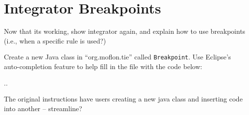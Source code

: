 \newpage
\section{Integrator Breakpoints}
\genHeader


Now that its working, show integrator again, and explain how to use breakpoints (i.e., when a specific rule is used?)

Create a new Java class in ``org.moflon.tie'' called \texttt{Breakpoint}. Use Eclipse's auto-completion feature to help fill in the file with the code below:

..

The original instructions have users creating a new java class and inserting code into another -- streamline?